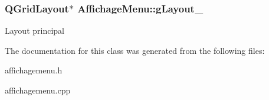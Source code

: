 \subsubsection[{\texorpdfstring{g\+Layout\+\_\+}{gLayout_}}]{\setlength{\rightskip}{0pt plus 5cm}Q\+Grid\+Layout$\ast$ Affichage\+Menu\+::g\+Layout\+\_\+\hspace{0.3cm}{\ttfamily [protected]}}\hypertarget{class_affichage_menu_a33ee17880f8d6d985c19eebf0e5f121b}{}\label{class_affichage_menu_a33ee17880f8d6d985c19eebf0e5f121b}
Layout principal 

The documentation for this class was generated from the following files\+:\begin{DoxyCompactItemize}
\item 
affichagemenu.\+h\item 
affichagemenu.\+cpp\end{DoxyCompactItemize}
